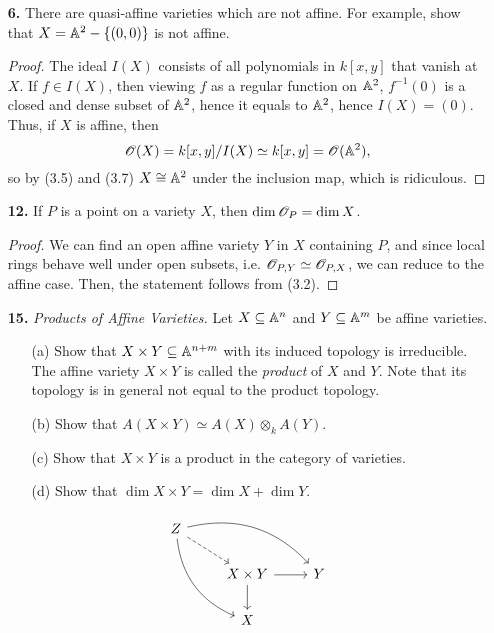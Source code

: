 \documentclass{article}
\begin{document}
\begin{enumerate} [label=\textbf{\arabic*.}, leftmargin=-0.05em]
\item[\textbf{6.}] There are quasi-affine varieties which are not affine. For example, show that $X = \mathbb{A}^2 - \{(0, 0) \}$ is not affine.

\begin{proof}
    The ideal $I(X)$ consists of all polynomials in $k[x, y]$ that vanish at $X$.
    If $f \in I(X)$, then viewing $f$ as a regular function on $\mathbb{A}^2$, $f^{-1}(0)$ is a closed and dense subset of $\mathbb{A}^2$, hence it equals to $\mathbb{A}^2$, hence $I(X) = (0)$.
    Thus, if $X$ is affine, then
    \begin{equation*}
        \mathscr{O}(X) = k[x, y] / I(X) \simeq k[x, y] = \mathscr{O}(\mathbb{A}^2),
    \end{equation*}
    so by (3.5) and (3.7) $X \cong \mathbb{A}^2$ under the inclusion map, which is ridiculous.
\end{proof}

\item[\textbf{12.}] If $P$ is a point on a variety $X$, then $\dim{\mathscr{O}_P} = \dim{X}$.

\begin{proof}
    We can find an open affine variety $Y$ in $X$ containing $P$, and since local rings behave well under open subsets, i.e. $\mathscr{O}_{P, Y} \simeq \mathscr{O}_{P, X}$, we can reduce to the affine case.
    Then, the statement follows from (3.2).
\end{proof}

\item[\textbf{15.}] \textit{Products of Affine Varieties.} Let $X \subseteq \mathbb{A}^n$ and $Y \subseteq \mathbb{A}^m$ be affine varieties.
\begin{itemize}
    \item[(a)] Show that $X \times Y \subseteq \mathbb{A}^{n + m}$ with its induced topology is irreducible. The affine variety $X \times Y$ is called the \textit{product} of $X$ and $Y$. Note that its topology is in general not equal to the product topology.

    \item[(b)] Show that $A(X \times Y) \simeq A(X) \otimes_k A(Y)$.

    \item[(c)] Show that $X \times Y$ is a product in the category of varieties.

    \item[(d)] Show that $\dim{X \times Y} = \dim{X} + \dim{Y}$.
\end{itemize}
\[ \begin{tikzcd}
    Z \arrow[rdd, bend right] \arrow[rrd, bend left] \arrow[rd, dashed] &                                &   \\
                                                                        & X \times Y \arrow[d] \arrow[r] & Y \\
                                                                        & X                              &  
\end{tikzcd} \]


\end{enumerate}
\end{document}
